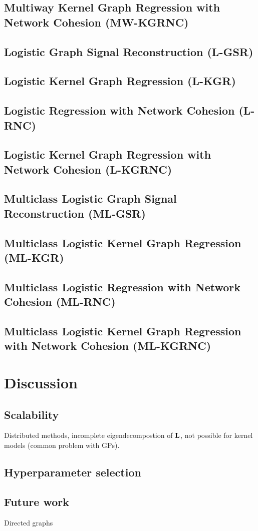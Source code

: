 \subsection{Multiway Kernel Graph Regression with Network Cohesion (MW-KGRNC)}

\subsection{Logistic Graph Signal Reconstruction (L-GSR)}

\subsection{Logistic Kernel Graph Regression (L-KGR)}

\subsection{Logistic Regression with Network Cohesion (L-RNC)}

\subsection{Logistic Kernel Graph Regression with Network Cohesion (L-KGRNC)}

\subsection{Multiclass Logistic Graph Signal Reconstruction (ML-GSR)}

\subsection{Multiclass Logistic Kernel Graph Regression (ML-KGR)}

\subsection{Multiclass Logistic Regression with Network Cohesion (ML-RNC)}

\subsection{Multiclass Logistic Kernel Graph Regression with Network Cohesion (ML-KGRNC)}

\section{Discussion}

\subsection{Scalability}

Distributed methods, incomplete eigendecompostion of $\mathbf{L}$, not possible for kernel models (common problem with GPs). 

\subsection{Hyperparameter selection}

\subsection{Future work}

Directed graphs